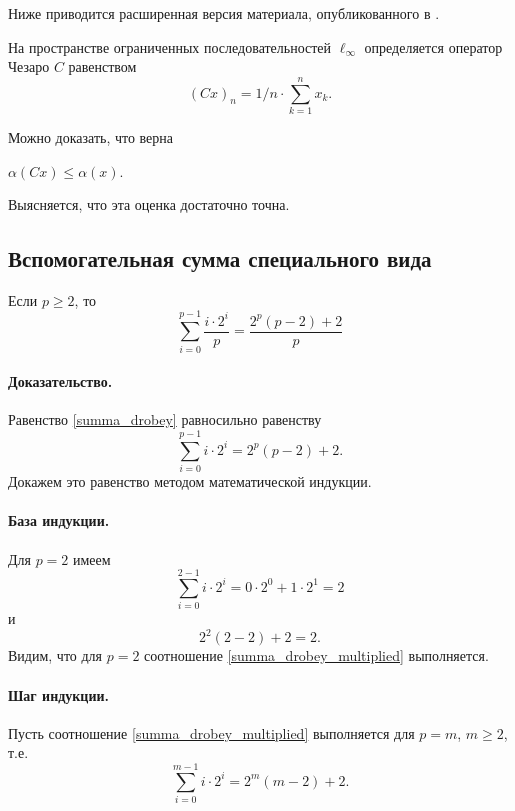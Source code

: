Ниже приводится расширенная версия материала, опубликованного в
\cite{our-vzms-2018}.

На пространстве ограниченных последовательностей $\ell_\infty$ определяется оператор Чезаро $C$
равенством
\begin{equation}
	(Cx)_n = {1}/{n} \cdot \sum_{k=1}^n x_k
	.
\end{equation}

Можно доказать, что верна
\begin{theorem}
	\label{thm:alpha_Cx_leq_alpha_x}
	$\alpha(Cx) \leqslant \alpha(x)$.
\end{theorem}
Выясняется, что эта оценка достаточно точна.

\subsection{Вспомогательная сумма специального вида}
\begin{lemma}
	Если $p\geq 2$, то
	\begin{equation}\label{summa_drobey}
		\sum_{i=0}^{p-1} \frac{i \cdot 2^i}{p} = \frac{2^p(p-2) + 2}{p}
	\end{equation}
\end{lemma}


\paragraph{Доказательство.}
Равенство \eqref{summa_drobey} равносильно равенству
\begin{equation}\label{summa_drobey_multiplied}
	\sum_{i=0}^{p-1} i \cdot 2^i = 2^p(p-2) + 2
	.
\end{equation}
Докажем это равенство методом математической индукции.

\paragraph{База индукции.}
Для $p=2$ имеем
\begin{equation}
	\sum_{i=0}^{2-1} i \cdot 2^i = 0 \cdot 2^0 + 1 \cdot 2^1 = 2
\end{equation}
и
\begin{equation}
	2^2(2-2) + 2 = 2
	.
\end{equation}
Видим, что для $p=2$ соотношение \eqref{summa_drobey_multiplied} выполняется.

\paragraph{Шаг индукции.}
Пусть соотношение \eqref{summa_drobey_multiplied} выполняется для $p=m$, $m\geq 2$, т.е.
\begin{equation}\label{summa_drobey_multiplied_m}
	\sum_{i=0}^{m-1} i \cdot 2^i = 2^m(m-2) + 2
	.
\end{equation}

